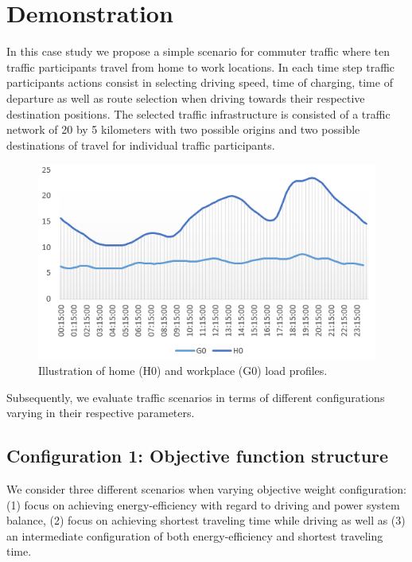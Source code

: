 \section{Demonstration}
\label{demonstration}

In this case study we propose a simple scenario for commuter traffic where ten traffic participants travel from home to work locations. In each time step traffic participants actions consist in selecting driving speed, time of charging, time of departure as well as route selection when driving towards their respective destination positions. The selected traffic infrastructure is consisted of a traffic network of 20 by 5 kilometers with two possible origins and two possible destinations of travel for individual traffic participants. 

\begin{figure}
	\centering
	\includegraphics[width=\columnwidth]{gfx/profiles.PNG}
	\caption{Illustration of home (H0) and workplace (G0) load profiles.}
	\label{profiles}
\end{figure}

Subsequently, we evaluate traffic scenarios in terms of different configurations varying in their respective parameters. 

\subsection{Configuration 1: Objective function structure}
We consider three different scenarios when varying objective weight configuration: (1) focus on achieving energy-efficiency with regard to driving and power system balance, (2) focus on achieving shortest traveling time while driving as well as (3) an intermediate configuration of both energy-efficiency and shortest traveling time.

